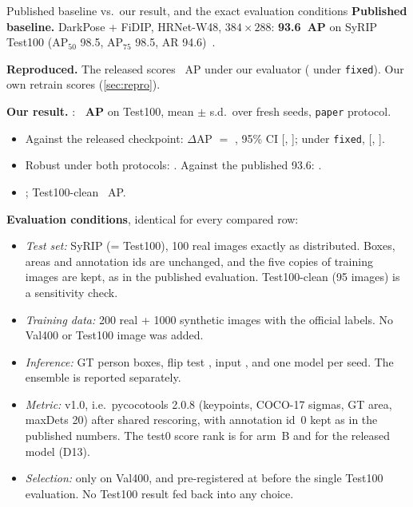 \begin{keybox}{Published baseline vs.\ our result, and the exact evaluation conditions}
\textbf{Published baseline.} DarkPose + FiDIP, HRNet-W48, $384{\times}288$: \textbf{93.6~AP} on SyRIP Test100 (AP$_{50}$ 98.5, AP$_{75}$ 98.5, AR 94.6)~\citep{huang2021fidip,fidipcode}.

\textbf{Reproduced.} The released  scores ~AP under our evaluator ( under \texttt{fixed}). Our own retrain scores  (\cref{sec:repro}).

\textbf{Our result.} : \textbf{~AP} on Test100, mean $\pm$ s.d.\ over  fresh seeds, \texttt{paper} protocol.
\begin{itemize}[leftmargin=12pt]
  \item Against the released checkpoint: $\Delta$AP $=$ , 95\% CI [, ]; under \texttt{fixed},  [, ].
  \item Robust under both protocols: \textbf{}. Against the published 93.6: .
  \item \APstrict{} ; Test100-clean ~AP.
\end{itemize}

\textbf{Evaluation conditions}, identical for every compared row:
\begin{itemize}[leftmargin=12pt]
  \item \emph{Test set:} SyRIP  (= Test100), 100 real images exactly as distributed. Boxes, areas and annotation ids are unchanged, and the five copies of training images are kept, as in the published evaluation. Test100-clean (95 images) is a sensitivity check.
  \item \emph{Training data:} 200 real + 1000 synthetic images with the official  labels. No Val400 or Test100 image was added.
  \item \emph{Inference:} GT person boxes, flip test , input , and one model per seed. The ensemble is reported separately.
  \item \emph{Metric:}  v1.0, i.e.\ pycocotools 2.0.8  (keypoints, COCO-17 sigmas, GT area, maxDets 20) after shared rescoring, with annotation id~0 kept as in the published numbers. The test0 score rank is  for arm~B and  for the released model (D13).
  \item \emph{Selection:} only on Val400, and pre-registered at  before the single Test100 evaluation. No Test100 result fed back into any choice.
\end{itemize}
\end{keybox}
